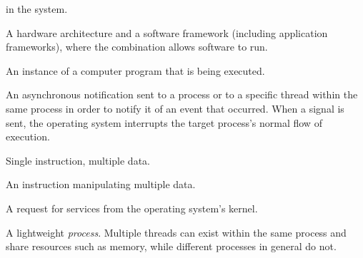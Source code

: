 \begin {description}
		in the system.
	\item [Platform] A hardware architecture and a software framework
		(including application frameworks), where the combination allows
		software to run.
	\item [Process] An instance of a computer program that is being executed.
	\item [Signal] An asynchronous notification sent to a process or to a
		specific thread within the same process in order to notify it of an
		event that occurred. When a signal is sent, the operating system
		interrupts the target process's normal flow of execution.
	\item [SIMD] Single instruction, multiple data.
	\item [SIMD instruction] An instruction manipulating multiple data.
	\item [System call] A request for services from the operating system's
		kernel.
	\item [Thread] A lightweight \emph{process}. Multiple threads can exist
		within the same process and share resources such as memory, while
		different processes in general do not.
\end {description}

